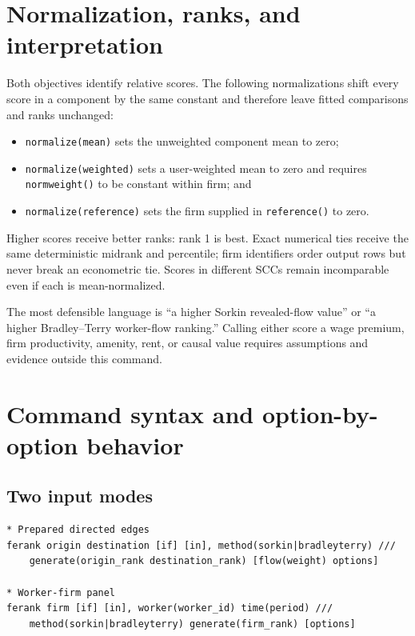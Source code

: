\documentclass[11pt]{article}
\begin{document}
\section{Normalization, ranks, and interpretation}
\label{sec:normalization}

Both objectives identify relative scores. The following normalizations shift
every score in a component by the same constant and therefore leave fitted
comparisons and ranks unchanged:
\begin{itemize}
  \item \texttt{normalize(mean)} sets the unweighted component mean to zero;
  \item \texttt{normalize(weighted)} sets a user-weighted mean to zero and
  requires \texttt{normweight()} to be constant within firm; and
  \item \texttt{normalize(reference)} sets the firm supplied in
  \texttt{reference()} to zero.
\end{itemize}
Higher scores receive better ranks: rank 1 is best. Exact numerical ties receive the same
deterministic midrank and percentile; firm identifiers order output rows but
never break an econometric tie. Scores in different SCCs remain incomparable
even if each is mean-normalized.

The most defensible language is ``a higher Sorkin revealed-flow value'' or ``a
higher Bradley--Terry worker-flow ranking.'' Calling either score a wage premium,
firm productivity, amenity, rent, or causal value requires assumptions and
evidence outside this command.

\section{Command syntax and option-by-option behavior}
\label{sec:syntax}

\subsection{Two input modes}

\begin{lstlisting}
* Prepared directed edges
ferank origin destination [if] [in], method(sorkin|bradleyterry) ///
    generate(origin_rank destination_rank) [flow(weight) options]

* Worker-firm panel
ferank firm [if] [in], worker(worker_id) time(period) ///
    method(sorkin|bradleyterry) generate(firm_rank) [options]
\end{lstlisting}
\end{document}
